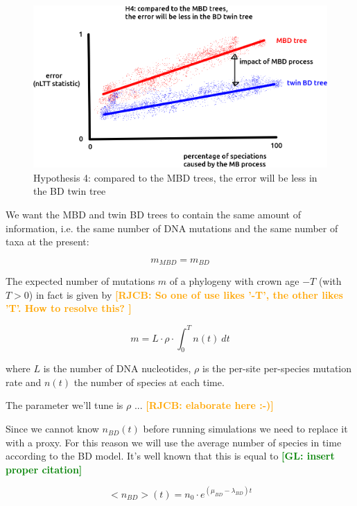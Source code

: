 \documentclass{article}
\newcommand*\richel[1]{\textcolor{orange}{\textbf{[RJCB: #1]}}}
\newcommand*\gio[1]{\textcolor{green}{\textbf{[GL: #1]}}}
\begin{document}
\begin{itemize}
\begin{figure}[!htbp]
  \includegraphics[width=\textwidth]{fig_h_4.png}
  \caption{
    Hypothesis 4: compared to the MBD trees, 
    the error will be less in the BD twin tree
  }
  \label{fig:h_4}
\end{figure}


We want the MBD and twin BD trees to contain the same amount of information, 
i.e. the same number of DNA mutations and the same number of taxa at the present:

\begin{equation}
m_{MBD} = m_{BD} \label{m equivalence}
\end{equation} 

The expected number of mutations $m$ of a phylogeny 
with crown age $-T$ (with $T>0$) in fact is given by
\richel{
  So one of use likes '-T', the other likes 'T'. How to resolve this?
}

\begin{equation}
m = L \cdot \rho \cdot \int_{0}^{T} n(t)\ dt \label{m calculation}
\end{equation}

where $L$ is the number of DNA nucleotides, 
$\rho$ is the per-site per-species mutation rate and
$n(t)$ the number of species at each time.

The parameter we'll tune is $\rho$ ... \richel{elaborate here :-)}

Since we cannot know $n_{BD}(t)$ before running simulations
we need to replace it with a proxy. 
For this reason we will use the average number of
species in time according to the BD model. 
It's well known that this is equal to \gio{insert proper citation}

\begin{equation}
    <n_{BD}>(t) = n_{0} \cdot e^{(\mu_{BD} - \lambda_{BD})t} \label{BD average n}
\end{equation}


\end{itemize}
\end{document}
